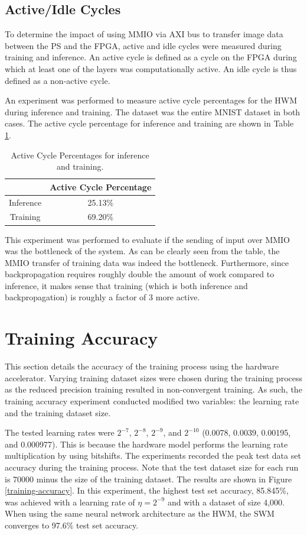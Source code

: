 \subsection{Active/Idle Cycles}
To determine the impact of using MMIO via AXI bus to transfer image data between the PS and the FPGA, active and idle cycles were measured during training and inference. An active cycle is defined as a cycle on the FPGA during which at least one of the layers was computationally active. An idle cycle is thus defined as a non-active cycle. 

An experiment was performed to measure active cycle percentages for the HWM during inference and training. The dataset was the entire MNIST dataset in both cases. The active cycle percentage for inference and training are shown in Table \ref{active-cycle-table}.

\begin{table}
	\centering 
	\begin{tabular}{|c|c|}
		\hline
		& \textbf{Active Cycle Percentage} \\\hline
		Inference & 25.13\% \\\hline 
		Training & 69.20\% \\\hline
	\end{tabular}
	\caption{Active Cycle Percentages for inference and training.}
	\label{active-cycle-table}
\end{table}

This experiment was performed to evaluate if the sending of input over MMIO was the bottleneck of the system. As can be clearly seen from the table, the MMIO transfer of training data was indeed the bottleneck. Furthermore, since backpropagation requires roughly double the amount of work compared to inference, it makes sense that training (which is both inference and backpropagation) is roughly a factor of 3 more active.

\section{Training Accuracy}
This section details the accuracy of the training process using the hardware accelerator. Varying training dataset sizes were chosen during the training process as the reduced precision training resulted in non-convergent training. As such, the training accuracy experiment conducted modified two variables: the learning rate and the training dataset size. 

The tested learning rates were $2^{-7}$, $2^{-8}$, $2^{-9}$, and $2^{-10}$ (0.0078, 0.0039, 0.00195, and 0.000977). This is because the hardware model performs the learning rate multiplication by using bitshifts. The experiments recorded the peak test data set accuracy during the training process. Note that the test dataset size for each run is 70000 minus the size of the training dataset. The results are shown in Figure \ref{training-accuracy}. In this experiment, the highest test set accuracy, 85.845\%, was achieved with a learning rate of $\eta = 2^{-9}$ and with a dataset of size 4,000. When using the same neural network architecture as the HWM, the SWM converges to 97.6\% test set accuracy.

